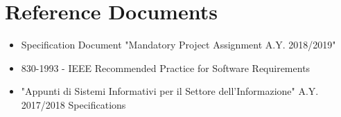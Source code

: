 \documentclass[12pt,a4paper]{article}
\begin{document}
	\section{Reference Documents}
	\begin{itemize}
		\item Specification Document "Mandatory Project Assignment A.Y. 2018/2019"
		\item 830-1993 - IEEE Recommended Practice for Software Requirements
		\item "Appunti di Sistemi Informativi per il Settore dell'Informazione" A.Y. 2017/2018
		Specifications
	\end{itemize}
\end{document}
